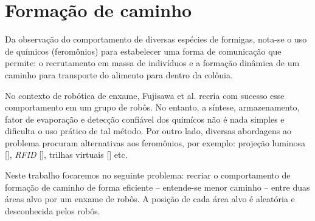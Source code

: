 \section{Formação de caminho}

Da observação do comportamento de diversas espécies de formigas, nota-se o uso de químicos (feromônios) para estabelecer uma forma de comunicação que permite: o recrutamento em massa de indivíduos e a formação dinâmica de um caminho para transporte do alimento para dentro da colônia.

No contexto de robótica de enxame, Fujisawa et al. \cite{fujisawa2008pheromone} recria com sucesso esse comportamento em um grupo de robôs. No entanto, a síntese, armazenamento, fator de evaporação e detecção confiável dos quimícos não é nada simples e dificulta o uso prático de tal método.
Por outro lado, diversas abordagens ao problema procuram alternativas aos feromônios, por exemplo: projeção luminosa [], \textit{RFID} [], trilhas virtuais [] etc.

Neste trabalho focaremos no seguinte problema: recriar o comportamento de formação de caminho de forma eficiente -- entende-se menor caminho -- entre duas áreas alvo por um enxame de robôs. A posição de cada área alvo é aleatória e desconhecida pelos robôs.